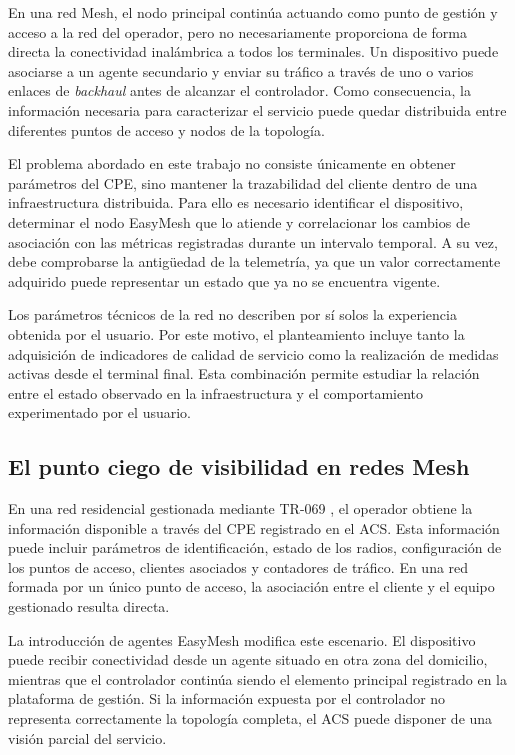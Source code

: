 En una red Mesh, el nodo principal continúa actuando como punto de gestión y 
acceso a la red del operador, pero no necesariamente proporciona de forma directa 
la conectividad inalámbrica a todos los terminales. Un dispositivo puede asociarse a un agente secundario 
y enviar su tráfico a través de uno o varios enlaces de \textit{backhaul} antes de alcanzar el controlador. 
Como consecuencia, la información necesaria para caracterizar el servicio puede quedar 
distribuida entre diferentes puntos de acceso y nodos de la topología.

El problema abordado en este trabajo no consiste únicamente en obtener parámetros del CPE, 
sino mantener la trazabilidad del cliente dentro de una infraestructura distribuida. 
Para ello es necesario identificar el dispositivo, determinar el nodo EasyMesh que lo atiende 
y correlacionar los cambios de asociación con las métricas registradas durante un intervalo temporal. 
A su vez, debe comprobarse la antigüedad de la telemetría, 
ya que un valor correctamente adquirido puede representar un estado que ya no se encuentra vigente.

Los parámetros técnicos de la red no describen por sí solos la experiencia obtenida por el usuario. 
Por este motivo, el planteamiento incluye tanto la adquisición de indicadores de calidad de servicio 
como la realización de medidas activas desde el terminal final. Esta combinación permite 
estudiar la relación entre el estado observado en la infraestructura 
y el comportamiento experimentado por el usuario.

\subsection{El punto ciego de visibilidad en redes Mesh}
\label{subsec:punto-ciego-mesh}

En una red residencial gestionada mediante TR-069
\cite{bbf_tr069}, el operador obtiene la información disponible a
través del CPE registrado en el ACS. Esta información puede incluir
parámetros de identificación, estado de los radios, configuración de los
puntos de acceso, clientes asociados y contadores de tráfico. En una red
formada por un único punto de acceso, la asociación entre el cliente y el
equipo gestionado resulta directa.

La introducción de agentes EasyMesh modifica este escenario. 
El dispositivo puede recibir conectividad desde un agente situado en otra zona del domicilio, 
mientras que el controlador continúa siendo el elemento principal registrado 
en la plataforma de gestión. Si la información expuesta por el controlador no 
representa correctamente la topología completa, 
el ACS puede disponer de una visión parcial del servicio.

